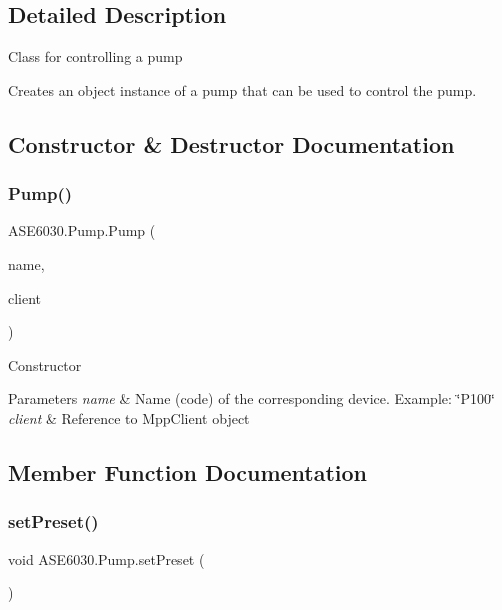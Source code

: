 \subsection{Detailed Description}
Class for controlling a pump 

Creates an object instance of a pump that can be used to control the pump. 

\subsection{Constructor \& Destructor Documentation}
\mbox{\label{class_a_s_e6030_1_1_pump_ac23356a1375f9dc895beeb922721635d}} 
\subsubsection{\texorpdfstring{Pump()}{Pump()}}
{\footnotesize\ttfamily A\+S\+E6030.\+Pump.\+Pump (\begin{DoxyParamCaption}\item[{String}]{name,  }\item[{ref Tut.\+Mpp\+Opc\+Ua\+Client\+Lib.\+Mpp\+Client}]{client }\end{DoxyParamCaption})\hspace{0.3cm}{\ttfamily [inline]}}



Constructor 


\begin{DoxyParams}{Parameters}
{\em name} & Name (code) of the corresponding device. Example\+: \char`\"{}\+P100\char`\"{}\\
\hline
{\em client} & Reference to Mpp\+Client object\\
\hline
\end{DoxyParams}


\subsection{Member Function Documentation}
\mbox{\label{class_a_s_e6030_1_1_pump_a25c0c51e6e9fbddecdf94f3523b971ad}} 
\subsubsection{\texorpdfstring{set\+Preset()}{setPreset()}}
{\footnotesize\ttfamily void A\+S\+E6030.\+Pump.\+set\+Preset (\begin{DoxyParamCaption}{ }\end{DoxyParamCaption})\hspace{0.3cm}{\ttfamily [inline]}}



